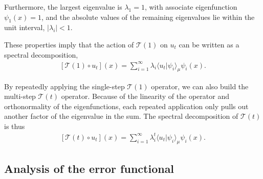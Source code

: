 \documentclass[aip, jcp, reprint, nolinenumbers, twocolumn, nobalancelastpage, nofootinbib]{revtex4-1}
\begin{document}
Furthermore, the largest eigenvalue is $\lambda_1=1$, with associate eigenfunction $\psi_1(x) = 1$, and the absolute values of the remaining eigenvalues lie within the unit interval, $|\lambda_i| < 1$.\cite{schutte2001transfer}

These properties imply that the action of $\mathcal{T}(1)$ on $u_t$ can be written as a spectral decomposition,
\begin{align}
    \label{eq:spectralT}
[\mathcal{T}(1) \circ u_t](x) = \sum_{i=1}^\infty \lambda_i \langle u_t | \psi_i \rangle_\mu \psi_i(x).
\end{align}

By repeatedly applying the single-step $\mathcal{T}(1)$ operator, we can also build the multi-step $\mathcal{T}(t)$ operator. Because of the linearity of the operator and orthonormality of the eigenfunctions, each repeated application only pulls out another factor of the eigenvalue in the sum. The spectral decomposition of $\mathcal{T}(t)$ is thus
\begin{align}
    \label{eq:spectralT2}
[\mathcal{T}(t) \circ u_t](x) = \sum_{i=1}^\infty \lambda_i^t \langle u_t | \psi_i \rangle_\mu \psi_i(x).
\end{align}

\subsection{Analysis of the error functional}
\label{subsect:analysis_of_the_error_function}
\end{document}
